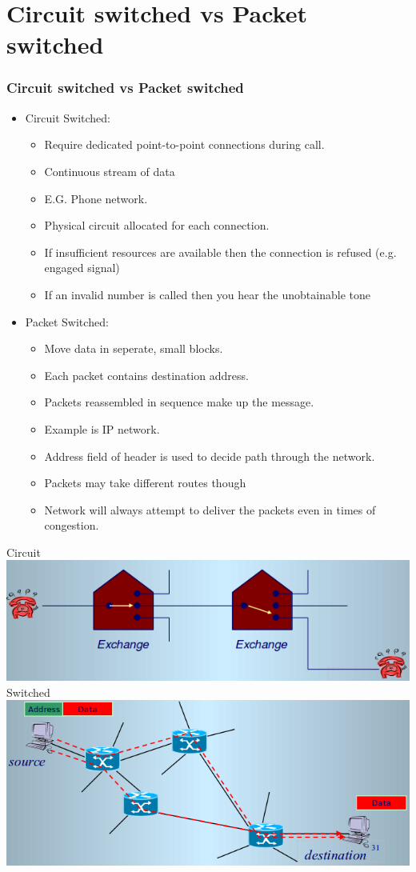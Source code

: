 \documentclass{beamer}
\begin{document}
\section{Circuit switched vs Packet switched}
\begin{frame}[allowframebreaks]
\frametitle{Circuit switched vs Packet switched}
\begin{itemize}
\item {\color{red}Circuit Switched:}
\begin{itemize}
\item Require dedicated point-to-point connections during call.
\item Continuous stream of data
\item E.G. Phone network.
\item Physical circuit allocated for each connection.
\item If insufficient resources are available then the connection is refused (e.g. engaged signal)
\item If an invalid number is called then you hear the unobtainable tone
\end{itemize}
\item {\color{green}Packet Switched:}
\begin{itemize}
\item Move data in seperate, small blocks.
\item Each packet contains destination address.
\item Packets reassembled in sequence make up the message.
\item Example is IP network.
\item Address field of header is used to decide path through the network.
\item Packets may take different routes though
\item Network will always attempt to deliver the packets even in times of congestion.
\end{itemize}
\end{itemize}
Circuit
\includegraphics[scale=0.4]{circuit.png}\\
Switched
\includegraphics[scale=0.4]{switched.png}
\end{frame}
\end{document}
